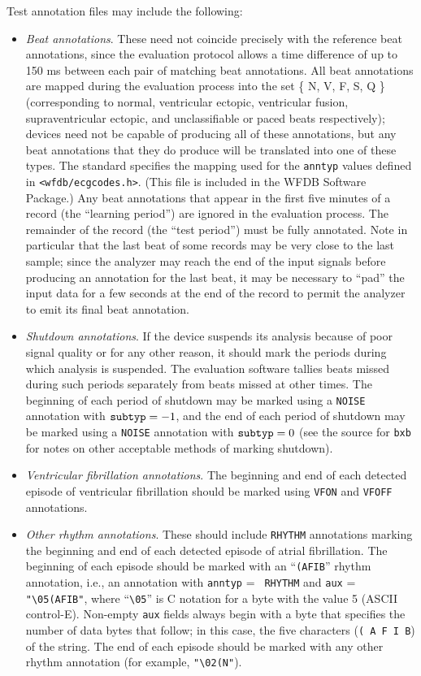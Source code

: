 \documentclass[twoside]{article}
\begin{document}
Test annotation files may include the following:
\begin{itemize}
   \item  {\em Beat annotations}.  These need not coincide precisely with the
reference beat annotations, since the evaluation protocol allows a time
difference of up to 150 ms between each pair of matching beat annotations.
All beat annotations are mapped during the evaluation process into the set
\{ N, V, F, S, Q \} (corresponding to normal, ventricular ectopic, ventricular
fusion, supraventricular ectopic, and unclassifiable or paced beats
respectively); devices need not be capable of producing all of these
annotations, but any beat annotations that they do produce will be translated
into one of these types.  The standard specifies the mapping used for the
{\tt anntyp} values defined in {\tt <wfdb/ecgcodes.h>}. (This file is
included in the WFDB Software Package.)  Any beat annotations that
appear in the first five minutes of a record (the ``learning period'') are
ignored in the evaluation process.  The remainder of the record (the ``test
period'') must be fully annotated.  Note in particular that the last beat of
some records may be very close to the last sample;  since the analyzer may
reach the end of the input signals before producing an annotation for the last
beat, it may be necessary to ``pad'' the input data for a few seconds at the
end of the record to permit the analyzer to emit its final beat annotation.

   \item {\em Shutdown annotations}.  If the device suspends its analysis
because of poor signal quality or for any other reason, it should mark the
periods during which analysis is suspended.  The evaluation software tallies
beats missed during such periods separately from beats missed at other times.
The beginning of each period of shutdown may be marked using a {\tt NOISE}
annotation with ${\tt subtyp} = -1$, and the end of each period of shutdown
may be marked using a {\tt NOISE} annotation with ${\tt subtyp} = 0$ (see
the source for {\tt bxb} for notes on other acceptable methods of marking
shutdown).

   \item {\em Ventricular fibrillation annotations}.  The beginning and end
of each detected episode of ventricular fibrillation should be marked using
{\tt VFON} and {\tt VFOFF} annotations.

   \item {\em Other rhythm annotations}.  These should include
{\tt RHYTHM} annotations marking the beginning and end of each detected episode
of atrial fibrillation.  The beginning of each episode should be marked with an
``{\tt (AFIB}'' rhythm annotation, i.e., an annotation with {\tt anntyp} = {\tt
RHYTHM} and {\tt aux} = \verb|"\05(AFIB"|, where ``\verb|\05|'' is C notation
for a byte with the value 5 (ASCII control-E).  Non-empty {\tt aux} fields
always begin with a byte that specifies the number of data bytes that follow;
in this case, the five characters ({\tt ( A F I B}) of the string.  The end of
each episode should be marked with any other rhythm annotation (for example,
\verb|"\02(N"|).


\end{itemize}
\end{document}
